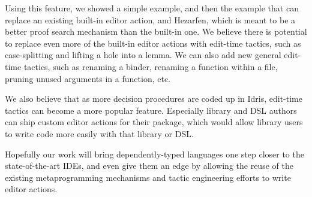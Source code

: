 Using this feature, we showed a simple  example, and then the
 example that can replace an existing built-in editor action,
and Hezarfen, which is meant to be a better proof search mechanism than the
built-in one. We believe there is potential to replace even more of the
built-in editor actions with edit-time tactics, such as case-splitting and
lifting a hole into a lemma. We can also add new general edit-time tactics,
such as renaming a binder, renaming a function within a file, pruning unused
arguments in a function, etc.

We also believe that as more decision procedures are coded up in Idris,
edit-time tactics can become a more popular feature. Especially library and DSL
authors can ship custom editor actions for their package, which would allow
library users to write code more easily with that library or DSL.

Hopefully our work will bring dependently-typed languages one step closer to the
state-of-the-art IDEs, and even give them an edge by allowing the reuse of the
existing metaprogramming mechanisms and tactic engineering efforts to write
editor actions.
